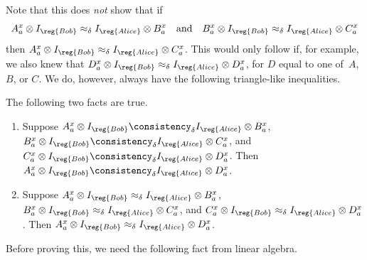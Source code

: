 Note that this does \emph{not} show that if
\begin{equation*}
A^x_a \otimes I_{\reg{Bob}} \approx_\delta I_{\reg{Alice}} \otimes B^x_a
\quad\text{and}\quad
B^x_a \otimes I_{\reg{Bob}} \approx_\delta I_{\reg{Alice}} \otimes C^x_a
\end{equation*}
then $A^x_a \otimes I_{\reg{Bob}} \approx_\delta I_{\reg{Alice}} \otimes C^x_a$.
This would only follow if, for example, we also knew that $D^x_a \otimes I_{\reg{Bob}} \approx_\delta I_{\reg{Alice}} \otimes D^x_a$,
for $D$ equal to one of~$A$, $B$, or $C$.
We do, however, always have the following triangle-like inequalities.

\begin{fact}\label{fact:triangle-like}
The following two facts are true.
\begin{enumerate}
\item Suppose $A^x_a \otimes I_{\reg{Bob}} \consistency_\delta I_{\reg{Alice}} \otimes B^x_a$,
	$B^x_a \otimes I_{\reg{Bob}} \consistency_\delta I_{\reg{Alice}} \otimes C^x_a$,
	and $C^x_a \otimes I_{\reg{Bob}} \consistency_\delta I_{\reg{Alice}} \otimes D^x_a$.
	Then $A^x_a \otimes I_{\reg{Bob}} \consistency_\delta I_{\reg{Alice}} \otimes D^x_a$.
\item Suppose $A^x_a \otimes I_{\reg{Bob}} \approx_\delta I_{\reg{Alice}} \otimes B^x_a$,
	$B^x_a \otimes I_{\reg{Bob}} \approx_\delta I_{\reg{Alice}} \otimes C^x_a$,
	and $C^x_a \otimes I_{\reg{Bob}} \approx_\delta I_{\reg{Alice}} \otimes D^x_a$.
	Then $A^x_a \otimes I_{\reg{Bob}} \approx_\delta I_{\reg{Alice}} \otimes D^x_a$.
\end{enumerate}
\end{fact}

Before proving this, we need the following fact from linear algebra.

